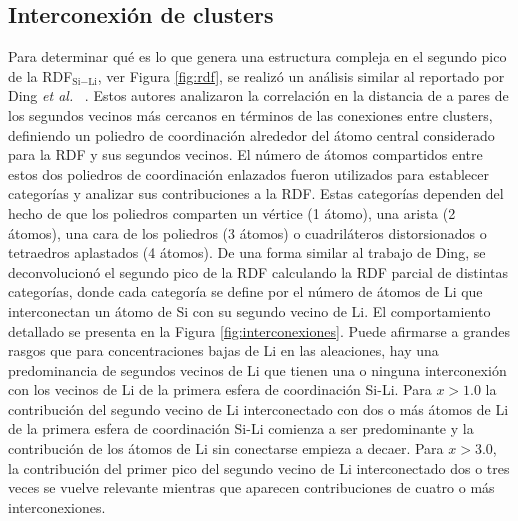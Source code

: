 \subsection{Interconexión de clusters}\label{s:interconexion}

Para determinar qué es lo que genera una estructura compleja en el segundo pico de la 
RDF$_{\text{Si}-\text{Li}}$, ver Figura \ref{fig:rdf}, se realizó un análisis similar al reportado por Ding \textit{et al.}
~\cite{ding2015}. Estos autores analizaron la correlación en la distancia de a
pares de los segundos vecinos más cercanos en términos de las conexiones entre
clusters, definiendo un poliedro de coordinación alrededor del átomo central 
considerado para la RDF y sus segundos vecinos. El número de átomos compartidos
entre estos dos poliedros de coordinación enlazados fueron utilizados para 
establecer categorías y analizar sus contribuciones a la RDF. Estas categorías
dependen del hecho de que los poliedros comparten un vértice (1 átomo), una 
arista (2 átomos), una cara de los poliedros (3 átomos) o cuadriláteros 
distorsionados o tetraedros aplastados (4 átomos). De una forma similar al trabajo de Ding, se deconvolucionó el segundo pico de la RDF calculando la RDF parcial 
de distintas categorías, donde cada categoría se define por el número de átomos de
Li que interconectan un átomo de Si con su segundo vecino de Li. El comportamiento
detallado se presenta en la Figura \ref{fig:interconexiones}. Puede afirmarse a 
grandes rasgos que para concentraciones bajas de Li en las aleaciones, hay una 
predominancia de segundos vecinos de Li que tienen una o ninguna interconexión 
con los vecinos de Li de la primera esfera de coordinación Si-Li. Para $x > 1.0$
la contribución del segundo vecino de Li interconectado con dos o más átomos de 
Li de la primera esfera de coordinación Si-Li comienza a ser predominante y la
contribución de los átomos de Li sin conectarse empieza a decaer. Para $x > 3.0$,
la contribución del primer pico del segundo vecino de Li interconectado dos o
tres veces se vuelve relevante mientras que aparecen contribuciones de cuatro o
más interconexiones.
